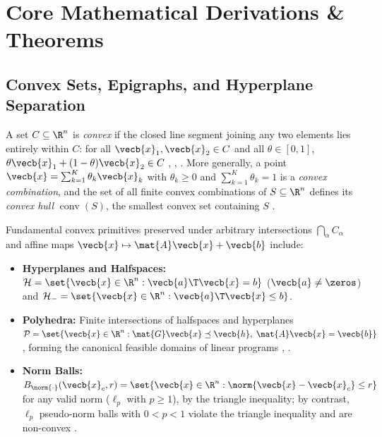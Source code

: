 \documentclass[../../../../master.tex]{subfiles}
\begin{document}
\section{Core Mathematical Derivations \& Theorems}
\label{sec:convex:derivations}

\subsection{Convex Sets, Epigraphs, and Hyperplane Separation}
\label{sec:convex:sets_separation}

A set $C \subseteq \R^n$ is \emph{convex} if the closed line segment joining any two elements lies entirely within $C$: for all $\vecb{x}_1, \vecb{x}_2 \in C$ and all $\theta \in [0, 1]$, $\theta \vecb{x}_1 + (1 - \theta)\vecb{x}_2 \in C$ , , . More generally, a point $\vecb{x} = \sum_{k=1}^K \theta_k \vecb{x}_k$ with $\theta_k \ge 0$ and $\sum_{k=1}^K \theta_k = 1$ is a \emph{convex combination}, and the set of all finite convex combinations of $S \subseteq \R^n$ defines its \emph{convex hull} $\operatorname{conv}(S)$, the smallest convex set containing $S$ .

Fundamental convex primitives preserved under arbitrary intersections $\bigcap_{\alpha} C_\alpha$ and affine maps $\vecb{x} \mapsto \mat{A}\vecb{x} + \vecb{b}$ include:
\begin{itemize}[leftmargin=1.4em]
  \item \textbf{Hyperplanes and Halfspaces:} $\mathcal{H} = \set{\vecb{x} \in \R^n : \vecb{a}\T\vecb{x} = b}$ ($\vecb{a} \neq \zeros$) and $\mathcal{H}_- = \set{\vecb{x} \in \R^n : \vecb{a}\T\vecb{x} \le b}$.
  \item \textbf{Polyhedra:} Finite intersections of halfspaces and hyperplanes $\mathcal{P} = \set{\vecb{x} \in \R^n : \mat{G}\vecb{x} \preceq \vecb{h},\; \mat{A}\vecb{x} = \vecb{b}}$, forming the canonical feasible domains of linear programs , .
  \item \textbf{Norm Balls:} $B_{\norm{\cdot}}(\vecb{x}_c, r) = \set{\vecb{x} \in \R^n : \norm{\vecb{x} - \vecb{x}_c} \le r}$ for any valid norm ($\ell_p$ with $p \ge 1$), by the triangle inequality; by contrast, $\ell_p$ pseudo-norm balls with $0 < p < 1$ violate the triangle inequality and are non-convex .
\end{itemize}
\end{document}
